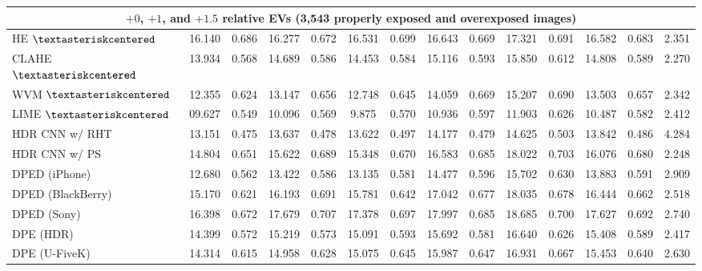 \documentclass[final]{cvpr}
\begin{document}
\begin{table*}
\begin{center}
{\begin{tabular}{|l|c|c|c|c|c|c|c|c|c|c|c|c|c|}
\multicolumn{14}{|c|}{\cellcolor[HTML]{CCECEB}$+0$, $+1$, and $+1.5$ relative EVs (3,543 properly exposed and overexposed images)}\\ \hline
HE \cite{10.5555/559707} $\textasteriskcentered$& 16.140 & \cellcolor[HTML]{FFCCCB}0.686 & 16.277 & 0.672 & 16.531 & 0.699 & 16.643 & 0.669 & 17.321  & 0.691 & 16.582 & 0.683 & 2.351\\
CLAHE \cite{adaptivehisteq} $\textasteriskcentered$& 13.934 & 0.568 & 14.689 & 0.586 & 14.453 &  0.584 & 15.116 & 0.593 & 15.850 & 0.612 & 14.808 & 0.589 & 2.270\\
WVM \cite{fu2016weighted} $\textasteriskcentered$& 12.355 & 0.624 & 13.147 & 0.656 & 12.748 & 0.645 & 14.059 & 0.669 & 15.207 & 0.690 & 13.503 & 0.657 & 2.342\\
\cellcolor[HTML]{D5D5D5}LIME \cite{guo2016lime, guo2017lime} $\textasteriskcentered$& 09.627 & 0.549 & 10.096 & 0.569 & 9.875 & 0.570 & 10.936 & 0.597 & 11.903 & 0.626 & 10.487 & 0.582 & 2.412\\
HDR CNN \cite{HDRCNN} w/ RHT \cite{yang2018image}& 13.151 & 0.475 & 13.637 & 0.478 & 13.622 & 0.497 & 14.177 & 0.479 & 14.625 & 0.503 & 13.842 & 0.486 & 4.284\\
HDR CNN \cite{HDRCNN} w/ PS \cite{dayley2010photoshop}& 14.804  & 0.651 & 15.622 & 0.689 & 15.348 & 0.670 & 16.583  & 0.685 & 18.022 & \cellcolor[HTML]{FFCCCB}0.703 & 16.076 & 0.680 & \cellcolor[HTML]{FFCCCB}2.248\\
DPED (iPhone) \cite{DPED}& 12.680  &  0.562 & 13.422 & 0.586 & 13.135 & 0.581 & 14.477 & 0.596 & 15.702 & 0.630 & 13.883 & 0.591 & 2.909 \\
DPED (BlackBerry) \cite{DPED} & 15.170 & 0.621 & 16.193 & 0.691 &  15.781 & 0.642 & 17.042 & 0.677 & 18.035 & 0.678 & 16.444 & 0.662 & 2.518\\
DPED (Sony) \cite{DPED}& \cellcolor[HTML]{FFCCCB}16.398 & 0.672 & \cellcolor[HTML]{FFCCCB}17.679 & \cellcolor[HTML]{FFCCCB}0.707 & \cellcolor[HTML]{FFCCCB}17.378 & 0.697 & \cellcolor[HTML]{FFCCCB}17.997 & \cellcolor[HTML]{FFCCCB}0.685 & \cellcolor[HTML]{FFCCCB}18.685 & 0.700 & \cellcolor[HTML]{FFCCCB}17.627 & \cellcolor[HTML]{FFCCCB}0.692 & 2.740\\
DPE (HDR) \cite{DPE} & 14.399 & 0.572 & 15.219 & 0.573 & 15.091 & 0.593 & 15.692 & 0.581 & 16.640 & 0.626 & 15.408 & 0.589 & 2.417\\
DPE (U-FiveK) \cite{DPE} & 14.314 & 0.615 & 14.958 & 0.628 & 15.075 & 0.645 & 15.987 & 0.647 & 16.931 & 0.667 & 15.453 & 0.640 & 2.630\\

\end{tabular}}
\end{center}
\end{table*}
\end{document}
